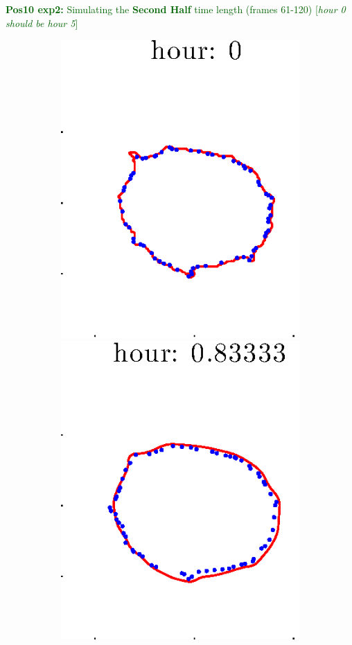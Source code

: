 \documentclass[12pt]{article}
\begin{document}
\clearpage

\noindent \textcolor{DarkGreen}{\textbf{Pos10 exp2:} Simulating the \textbf{Second Half} time length (frames 61-120) [\textit{hour 0 should be hour 5}]}

\begin{figure}[h!]
\centering
	\begin{subfigure}[b]{.3\textwidth}
	\centering
		\includegraphics[height=.15\textheight]{Pos10exp2/secondhalf/full1.eps}
		\includegraphics[height=.15\textheight]{Pos10exp2/secondhalf/full2.eps}

\end{subfigure}
\end{figure}
\end{document}
